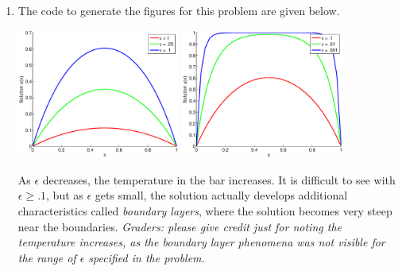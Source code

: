 {\begin{solution}
\begin{enumerate}
\[
A_{ij} = \int_0^1 \phi_j(x) \phi_i(x) dx + \epsilon \int_0^1 \frac{\partial \phi_j}{\partial x}\frac{\partial \phi_i}{\partial x} dx = M_{ij} + \epsilon K_{ij}
\]
where $M_{ij} = \int_0^1 \phi_j(x) \phi_i(x) dx$ is the Gram matrix for hat functions using the $L^2$ inner product.  The entries of $M$ and $K$ are known to be
\[
M_{ij} = \begin{cases}
M_{i,i} &= 2h/3\\
M_{i+1,i} &= h/6\\
M_{ij} &= 0, \quad |i - j| > 1
\end{cases}, \quad 
K_{ij} = \begin{cases}
K_{i,i} &= 2/h\\
K_{i+1,i} &= -1/h\\
K_{ij} &= 0, \quad |i - j| > 1
\end{cases}
\]
from class and from previous homeworks.  
\item The code to generate the figures for this problem are given below.  

\begin{center}
\includegraphics[width=0.42\textwidth]{ep1}\quad
\includegraphics[width=0.42\textwidth]{ep2}
\end{center}

As $\epsilon$ decreases, the temperature in the bar increases.  It is difficult to see with $\epsilon \geq .1$, but as $\epsilon$ gets small, the solution actually develops additional characteristics called \emph{boundary layers}, where the solution becomes very steep near the boundaries.  \emph{Graders: please give credit just for noting the temperature increases, as the boundary layer phenomena was not visible for the range of $\epsilon$ specified in the problem.}


\end{enumerate}
\end{solution}}
